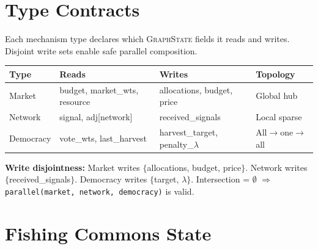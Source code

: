\documentclass[11pt]{article}
\begin{document}
\section{Type Contracts}

Each mechanism type declares which \textsc{GraphState} fields it reads and writes.
Disjoint write sets enable safe parallel composition.

\begin{center}
\begin{tabular}{@{}llll@{}}
\toprule
\textbf{Type} & \textbf{Reads} & \textbf{Writes} & \textbf{Topology} \\
\midrule
Market & budget, market\_wts, resource & allocations, budget, price & Global hub \\
Network & signal, adj[network] & received\_signals & Local sparse \\
Democracy & vote\_wts, last\_harvest & harvest\_target, penalty\_$\lambda$ & All$\to$one$\to$all \\
\bottomrule
\end{tabular}
\end{center}

\noindent\textbf{Write disjointness:} Market writes $\{$allocations, budget, price$\}$.
Network writes $\{$received\_signals$\}$. Democracy writes $\{$target, $\lambda\}$.
Intersection = $\emptyset$ $\Rightarrow$ \texttt{parallel(market, network, democracy)} is valid.

\section{Fishing Commons State}
\end{document}
